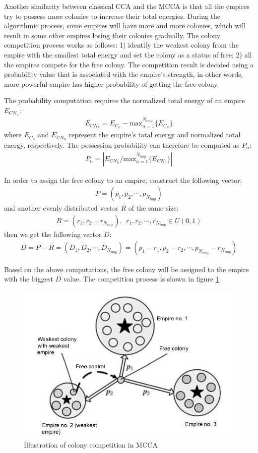 Another similarity between classical CCA and the MCCA is that all the empires try to possess more colonies to increase their total energies.
During the algorithmic process, some empires will have more and more colonies, which will result in some other empires losing their colonies gradually.
The colony competition process works as follows: 1) identify the weakest colony from the empire with the smallest total energy and set the colony as a status of free; 2) all the empires compete for the free colony.
The competition result is decided using a probability value that is associated with the empire's strength, in other words, more powerful empire has higher probability of getting the free colony.

The probability computation requires the normalized total energy of an empire $E_{CN_n}$: 
\begin{align}
	E_{CN_n} = E_{C_n} - \text{max}_{n = 1}^{N_{imp}}\{E_{C_n}\}
\end{align}
where $E_{C_n}$ and $E_{CN_n}$ represent the empire's total energy and normalized total energy, respectively.
The possession probability can therefore be computed as $P_n$:
\begin{align}
	P_n = |E_{CN_n}/\text{max}_{n = 1}^{N_{imp}}\{E_{CN_n}\}|
\end{align}

In order to assign the free colony to an empire, construct the following vector:
\begin{align}
	P = (p_1, p_2, \cdots, p_{N_{imp}})
\end{align}
and another evenly distributed vector $R$ of the same size:
\begin{align}
	R = (r_1, r_2, \cdot, r_{N_{imp}}), \ \ r_1, r_2, \cdots, r_{N_{imp}} \in U(0, 1)
\end{align}
then we get the following vector $D$:
\begin{align}
	D = P-R 
	= (D_1, D_2, \cdots, D_{N_{imp}}) 
	= (p_1 - r_1, p_2 - r_2, \cdots, p_{N_{imp}} - r_{N_{imp}})
\end{align}

Based on the above computations, the free colony will be assigned to the empire with the biggest $D$ value.
The competition process is shown in figure \ref{fig:fig2}.

\begin{figure}[h!]
	\begin{center}
		\includegraphics[width=0.5\linewidth]{sections/figure2.jpg}
		\caption{Illustration of colony competition in MCCA}
		\label{fig:fig2}
	\end{center}
\end{figure}

